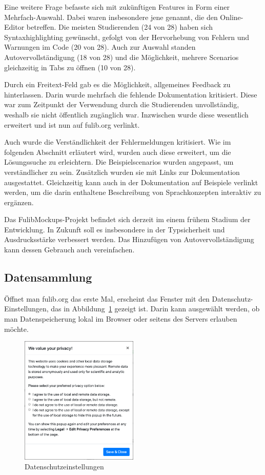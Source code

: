 Eine weitere Frage befasste sich mit zukünftigen Features in Form einer Mehrfach-Auswahl.
Dabei waren insbesondere jene genannt, die den Online-Editor betreffen.
Die meisten Studierenden (24 von 28) haben sich Syntaxhighlighting gewünscht, gefolgt von der Hervorhebung von Fehlern und Warnungen im Code (20 von 28).
Auch zur Auswahl standen Autovervollständigung (18 von 28) und die Möglichkeit, mehrere Scenarios gleichzeitig in Tabs zu öffnen (10 von 28).

Durch ein Freitext-Feld gab es die Möglichkeit, allgemeines Feedback zu hinterlassen.
Darin wurde mehrfach die fehlende Dokumentation kritisiert.
Diese war zum Zeitpunkt der Verwendung durch die Studierenden unvollständig, weshalb sie nicht öffentlich zugänglich war.
Inzwischen wurde diese wesentlich erweitert und ist nun auf fulib.org verlinkt.

Auch wurde die Verständlichkeit der Fehlermeldungen kritisiert.
Wie im folgenden Abschnitt erläutert wird, wurden auch diese erweitert, um die Lösungssuche zu erleichtern.
Die Beispielscenarios wurden angepasst, um verständlicher zu sein.
Zusätzlich wurden sie mit Links zur Dokumentation ausgestattet.
Gleichzeitig kann auch in der Dokumentation auf Beispiele verlinkt werden, um die darin enthaltene Beschreibung von Sprachkonzepten interaktiv zu ergänzen.

Das FulibMockups-Projekt befindet sich derzeit im einem frühem Stadium der Entwicklung.
In Zukunft soll es insbesondere in der Typsicherheit und Ausdrucksstärke verbessert werden.
Das Hinzufügen von Autovervollständigung kann dessen Gebrauch auch vereinfachen.

\subsection{Datensammlung}\label{subsec:data-collection}

Öffnet man fulib.org das erste Mal, erscheint das Fenster mit den Datenschutz-Einstellungen, das in Abbildung~\ref{fig:privacy} gezeigt ist.
Darin kann ausgewählt werden, ob man Datenspeicherung lokal im Browser oder seitens des Servers erlauben möchte.

\begin{figure}
    \centering
    \includegraphics[width=0.5\textwidth]{chapter/fulib.org/img/privacy.png}
    \caption{Datenschutzeinstellungen}
    \label{fig:privacy}
\end{figure}

